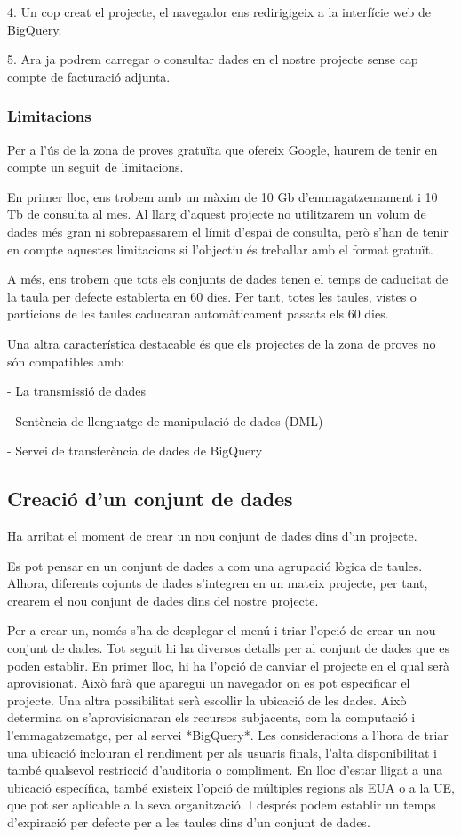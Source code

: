 \documentclass[12pt,longbibliography]{article}
\theoremstyle{definition}
\theoremstyle{remark}
\begin{document}
4. Un cop creat el projecte, el navegador ens redirigigeix a la interfície web de BigQuery.

5. Ara ja podrem carregar o consultar dades en el nostre projecte sense cap compte de facturació adjunta.

\subsubsection{Limitacions}

Per a l’ús de la zona de proves gratuïta que ofereix Google, haurem de tenir en compte un seguit de limitacions.

En primer lloc, ens trobem amb un màxim de 10 Gb d’emmagatzemament i 10 Tb de consulta al mes. Al llarg d’aquest projecte no utilitzarem un volum de dades més gran ni sobrepassarem el límit d’espai de consulta, però s’han de tenir en compte aquestes limitacions si l’objectiu és treballar amb el format gratuït.

A més, ens trobem que tots els conjunts de dades tenen el temps de caducitat de la taula per defecte establerta en 60 dies. Per tant, totes les taules, vistes o particions de les taules caducaran automàticament passats els 60 dies.

Una altra característica destacable és que els projectes de la zona de proves no són compatibles amb:

- La transmissió de dades

- Sentència de llenguatge de manipulació de dades (DML)

- Servei de transferència de dades de BigQuery

\newpage

\subsection{Creació d'un conjunt de dades}

Ha arribat el moment de crear un nou conjunt de dades dins d'un projecte. 

Es pot pensar en un conjunt de dades a  com una agrupació lògica de taules. Alhora, diferents cojunts de dades s'integren en un mateix projecte, per tant, crearem el nou conjunt de dades dins del nostre projecte. 

Per a crear un, només s'ha de desplegar el menú i triar l'opció de crear un nou conjunt de dades. Tot seguit hi ha diversos detalls per al conjunt de dades que es poden establir. En primer lloc, hi ha l'opció de canviar el projecte en el qual serà aprovisionat. Això farà que aparegui un navegador on es pot especificar el projecte. Una altra possibilitat serà escollir la ubicació de les dades. Això determina on s'aprovisionaran els recursos subjacents, com la computació i l'emmagatzematge, per al servei *BigQuery*. Les consideracions a l'hora de triar una ubicació inclouran el rendiment per als usuaris finals, l'alta disponibilitat i també qualsevol restricció d'auditoria o compliment. En lloc d'estar lligat a una ubicació específica, també existeix l'opció de múltiples regions als EUA o a la UE, que pot ser aplicable a la seva organització. I després podem establir un temps d'expiració per defecte per a les taules dins d'un conjunt de dades.
\end{document}
